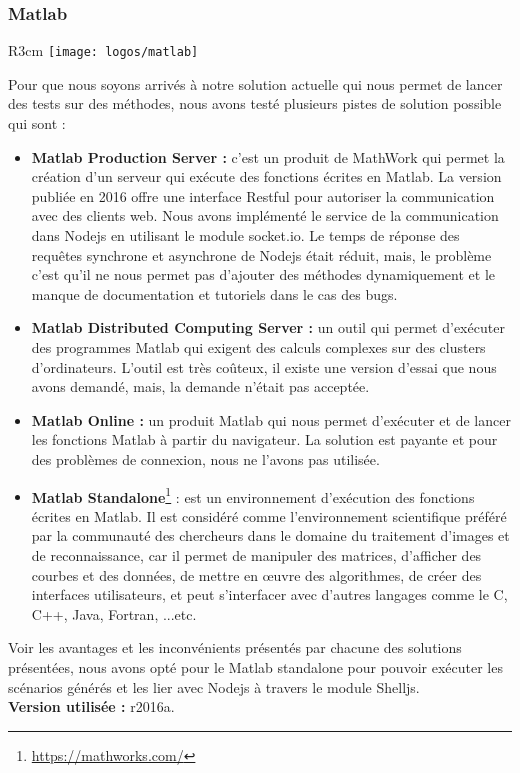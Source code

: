 \subsubsection{Matlab} 
\begin{wrapfigure}{R}{3cm}	\vspace{-20px}
	\texttt{[image: logos/matlab]}
\end{wrapfigure} 
Pour que nous soyons arrivés à notre solution actuelle qui nous permet de lancer des tests sur des méthodes, nous avons testé plusieurs pistes de solution possible qui sont :
\begin{itemize}
\item \textbf{Matlab Production Server :} c'est un produit de MathWork qui permet la création d'un serveur qui exécute des fonctions écrites en Matlab. La version publiée en 2016 offre une interface Restful pour autoriser la communication avec des clients web. Nous avons implémenté le service de la communication dans Nodejs en utilisant le module socket.io. Le temps de réponse des requêtes synchrone et asynchrone de Nodejs était réduit, mais, le problème c'est qu'il ne nous permet pas d'ajouter des méthodes dynamiquement et le manque de documentation et tutoriels dans le cas des bugs.
\item \textbf{Matlab Distributed Computing Server :} un outil qui permet d'exécuter des programmes Matlab qui exigent des calculs complexes sur des clusters d'ordinateurs. L’outil est très coûteux, il existe une version d'essai que nous avons demandé, mais, la demande n’était pas acceptée. 
\item \textbf{Matlab Online :} un produit Matlab qui nous permet d’exécuter et de lancer les fonctions Matlab à partir du navigateur. La solution est payante et pour des problèmes de connexion, nous ne l’avons pas utilisée.
\item \textbf{Matlab Standalone}\footnote{\href{https://in.mathworks.com/products/matlab.html}{https://mathworks.com/}} : est un environnement d'exécution des fonctions écrites en Matlab. Il est considéré comme l’environnement scientifique préféré par la communauté des chercheurs dans le domaine du traitement d’images et de reconnaissance, car il permet de manipuler des matrices, d'afficher des courbes et des données, de mettre en œuvre des algorithmes, de créer des interfaces utilisateurs, et peut s’interfacer avec d’autres langages comme le C, C++, Java, Fortran, ...etc.
\end{itemize}
Voir les avantages et les inconvénients présentés par chacune des solutions présentées, nous avons opté pour le Matlab standalone pour pouvoir exécuter les scénarios générés et les lier avec Nodejs à travers le module Shelljs. 
\\
\textbf{Version utilisée :} r2016a.

